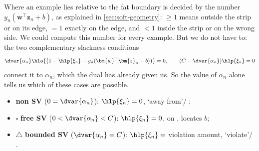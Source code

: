 Where an example lies relative to the fat boundary is decided by the number
\(y_n (\bm{w}^\top \bm{z}_n + b)\), as explained in
\autoref{sec:soft-geometry}: \(\ge 1\) means outside the strip or on its
edge, \(= 1\) exactly on the edge, and \(< 1\) inside the strip or on the
wrong side.
We could compute this number for every example. But we do not have to: the
two complementary slackness conditions
\[
    \dvar{\alpha_n} \hlo{\bigl( 1 - \hlp{\xi_n} - y_n (\bm{w}^\top \bm{z}_n +
    b) \bigr)} = 0, \qquad (C - \dvar{\alpha_n}) \hlp{\xi_n} = 0
\]
connect it to \(\alpha_n\), which the dual has already given us. So the
value of \(\alpha_n\) alone tells us which of these cases are possible.

\begin{center}
    \begin{minipage}[c]{0.56\textwidth}
        \begin{itemize}
            \item \textbf{non SV} (\(0 = \dvar{\alpha_n}\)):
                \(\hlp{\xi_n} = 0\), `away from'/ ;
            \item \(\square\) \textbf{free SV} (\(0 < \dvar{\alpha_n} <
                C\)): \(\hlp{\xi_n} = 0\), on , locates
                \(b\);
            \item \(\triangle\) \textbf{bounded SV} (\(\dvar{\alpha_n} =
                C\)): \(\hlp{\xi_n} =\) violation amount,
                `violate'/ .
        \end{itemize}
    \end{minipage}%
    \hfill
    \begin{minipage}[c]{0.4\textwidth}
        \centering
        \softAlphaPanel
    \end{minipage}
\end{center}


